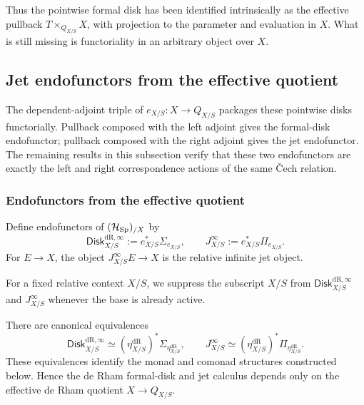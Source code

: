 Thus the pointwise formal disk has been identified intrinsically as the
effective pullback \(T\times_{Q_{X/S}}X\), with projection to the parameter and
evaluation in \(X\). What is still missing is functoriality in an arbitrary
object over \(X\).

\subsection{Jet endofunctors from the effective quotient}
\label{sec:jet-endofunctors}

The dependent-adjoint triple of \(e_{X/S}:X\to Q_{X/S}\) packages these
pointwise disks functorially. Pullback composed with the left adjoint gives the
formal-disk endofunctor; pullback composed with the right adjoint gives the jet
endofunctor. The remaining results in this subsection verify that these two
endofunctors are exactly the left and right correspondence actions of the same
\v{C}ech relation.

\subsubsection{Endofunctors from the effective quotient}

\begin{definition}
Define endofunctors of \((\mathcal H_{\operatorname{Sp}})_{/X}\) by
\[
  \mathsf{Disk}^{\mathrm{dR},\infty}_{X/S}
  :=
  e_{X/S}^*\Sigma_{e_{X/S}},
  \qquad
  J^\infty_{X/S}
  :=
  e_{X/S}^*\Pi_{e_{X/S}}.
\]
For \(E\to X\), the object \(J^\infty_{X/S}E\to X\) is the relative infinite
jet object.
\end{definition}

For a fixed relative context \(X/S\), we suppress the subscript \(X/S\) from
\(\mathsf{Disk}^{\mathrm{dR},\infty}_{X/S}\) and \(J^\infty_{X/S}\) whenever
the base is already active.

\begin{theorem}
\label{thm:effective-image-jets}
There are canonical equivalences
\[
  \mathsf{Disk}^{\mathrm{dR},\infty}_{X/S}
  \simeq
  (\eta_{X/S}^{\mathrm{dR}})^*
  \Sigma_{\eta_{X/S}^{\mathrm{dR}}},
  \qquad
  J^\infty_{X/S}
  \simeq
  (\eta_{X/S}^{\mathrm{dR}})^*
  \Pi_{\eta_{X/S}^{\mathrm{dR}}}.
\]
These equivalences identify the monad and comonad structures constructed below.
Hence the de Rham formal-disk and jet calculus depends only on the effective de Rham quotient
\(X\to Q_{X/S}\).
\end{theorem}

